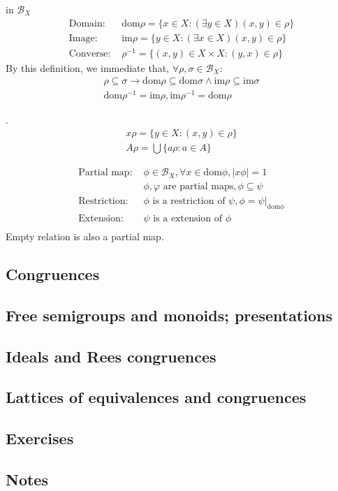 \begin{Def} in $\mathcal{B}_X$
    \begin{align*}
        \text{Domain: } & \mathrm{dom } \rho=\{x\in X: (\exists y\in X)(x,y)\in \rho\} \\
        \text{Image: } & \mathrm{im } \rho = \{y\in X:(\exists x\in X)(x,y)\in \rho\}  \\
        \text{Converse: } & \rho^{-1}=\{(x,y)\in X\times X: (y,x)\in \rho\}
    \end{align*}
    By this definition, we immediate that, $\forall \rho,\sigma\in \mathcal{B}_X$:
    \begin{align*}
        \rho \subseteq \sigma \rightarrow \mathrm{dom } \rho \subseteq \mathrm{dom }\sigma \wedge \mathrm{im }\rho \subseteq \mathrm{im } \sigma    \\
        \mathrm{dom }\rho^{-1}=\mathrm{im }\rho, \mathrm{im }\rho^{-1}=\mathrm{dom }\rho
    \end{align*}
\end{Def}

\begin{Def}.
    \begin{align*}
        x\rho=\{y\in X: (x,y)\in\rho\}  \\
        A\rho=\bigcup\{a\rho:a\in A\}
    \end{align*}
\end{Def}

\begin{Def}
    \begin{align*}
        \text{Partial map: } &\phi \in \mathcal{B}_X, \forall x\in \mathrm{dom }\phi, |x\phi|=1 \\
        & \phi, \varphi \text{ are partial maps}, \phi \subseteq \psi    \\
        \text{Restriction: } & \phi \text{ is a restriction of } \psi, \phi = \psi|_{\mathrm{dom }\phi}  \\
        \text{Extension: } & \psi \text{ is a extension of } \phi   \\
    \end{align*}
    Empty relation is also a partial map.
\end{Def}

\subsection[5]{Congruences}
\subsection[6]{Free semigroups and monoids; presentations}
\subsection[7]{Ideals and Rees congruences}
\subsection[8]{Lattices of equivalences and congruences}
\subsection[9]{Exercises}
\subsection[10]{Notes}
